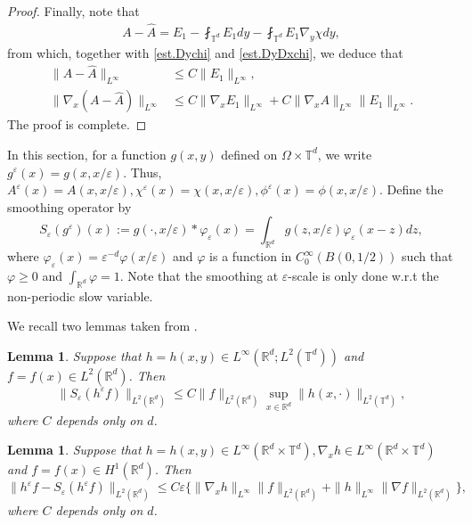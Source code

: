 \documentclass[reqno,12pt]{amsart} %
\newtheorem{lemma}[theorem]{Lemma}
\theoremstyle{definition}
\theoremstyle{remark}
\numberwithin{equation}{section}
\newcommand{\R}{\mathbb{R}}
\newcommand{\T}{\mathbb{T}}
\newcommand{\e}{\varepsilon}
\begin{document}
\begin{proof}
Finally, note that
\begin{align*}
  A-\widehat{A}=E_1-\fint_{\mathbb{T}^d}E_1 dy-\fint_{\mathbb{T}^d}E_1\nabla_{y} \chi dy,
\end{align*}
from which, together with \eqref{est.Dychi} and \eqref{est.DyDxchi}, we  deduce that
\begin{align*}
  \|A-\widehat{A}\|_{L^\infty}&\leq C\|E_1\|_{L^\infty},\\
  \|\nabla_x(A-\widehat{A})\|_{L^\infty}&\leq C\|\nabla_xE_1\|_{L^\infty}+C\|\nabla_xA\|_{L^\infty}\|E_1\|_{L^\infty}. 
\end{align*}
The proof is complete.
\end{proof}

In this section, for a  function $g(x,y)$ defined on $\Omega \times \T^d$, we write $g^\e(x) = g(x,x/\e)$.
Thus, $A^\e(x) = A(x,x/\e), \chi^\e(x) = \chi(x,x/\e), \phi^\e(x) = \phi(x,x/\e)$.
 Define the smoothing operator by 
$$S_\varepsilon(g^\varepsilon)(x):= g(\cdot, x/\e)* \varphi_\e(x) = \int_{\mathbb{R}^d}g(z,x/\varepsilon)\varphi_\varepsilon(x-z)dz,$$ 
where $\varphi_\varepsilon(x)=\varepsilon^{-d}\varphi(x/{\varepsilon})$ and $\varphi$ is a function in $C_0^\infty(B(0, 1/2))$ such that  $\varphi\geq 0$ and $\int_{\mathbb{R}^d}\varphi =1$. Note that the smoothing at $\e$-scale is only done w.r.t the non-periodic slow variable.

We recall two lemmas taken from \cite[Lemmas 2.2 and 2.3]{Niu20_reiterated}.

\begin{lemma}
    Suppose that $h = h(x,y) \in L^\infty(\R^d; L^2(\T^d))$ and $f = f(x) \in L^2(\R^d)$. Then
    \begin{equation*}
        \| S_\e(h^\e f) \|_{L^2(\R^d)} \le C \| f\|_{L^2(\R^d)} \sup_{x\in \R^d} \| h(x,\cdot)\|_{L^2(\T^d)},
    \end{equation*}
    where $C$ depends only on $d$.
\end{lemma}

\begin{lemma}\label{lem.h-Seh}
    Suppose that $h = h(x,y) \in L^\infty(\R^d \times \T^d), \nabla_x h \in L^\infty(\R^d \times \T^d)$ and $f = f(x) \in H^1(\R^d)$. Then
    \begin{equation*}
        \| h^\e f - S_\e (h^\e f) \|_{L^2(\R^d)} \le C\e \Big\{ \| \nabla_x h\|_{L^\infty} \| f\|_{L^2(\R^d)} + \| h\|_{L^\infty} \| \nabla f\|_{L^2(\R^d)} \Big\},
    \end{equation*}
    where $C$ depends only on $d$.
\end{lemma}
\end{document}
